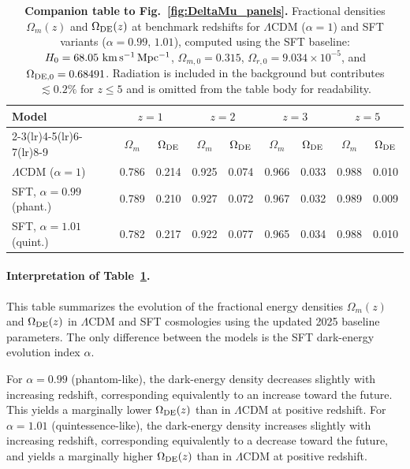 \documentclass[12pt]{article}
\begin{document}
\begin{table}[h!]
\centering
\small
\setlength{\tabcolsep}{5.5pt}
\renewcommand{\arraystretch}{1.15}
\caption{
\textbf{Companion table to Fig.~\ref{fig:DeltaMu_panels}.}
Fractional densities $\Omega_m(z)$ and $\Omega_{\rm DE}(z)$ at benchmark redshifts 
for $\Lambda$CDM ($\alpha=1$) and SFT variants ($\alpha=0.99,\,1.01$),
computed using the SFT baseline:
$H_0=68.05~{\rm km\,s^{-1}\,Mpc^{-1}}$, 
$\Omega_{m,0}=0.315$, 
$\Omega_{r,0}=9.034\times10^{-5}$, 
and $\Omega_{\rm DE,0}=0.68491$.
Radiation is included in the background but contributes $\lesssim0.2\%$ 
for $z\le5$ and is omitted from the table body for readability.
}
\label{tab:Omega_benchmarks_companion}
\begin{tabular}{lcccccccc}
\toprule
\multirow{2}{*}{Model} &
\multicolumn{2}{c}{$z=1$} &
\multicolumn{2}{c}{$z=2$} &
\multicolumn{2}{c}{$z=3$} &
\multicolumn{2}{c}{$z=5$} \\
\cmidrule(lr){2-3}\cmidrule(lr){4-5}\cmidrule(lr){6-7}\cmidrule(lr){8-9}
 & $\Omega_m$ & $\Omega_{\rm DE}$ 
 & $\Omega_m$ & $\Omega_{\rm DE}$ 
 & $\Omega_m$ & $\Omega_{\rm DE}$ 
 & $\Omega_m$ & $\Omega_{\rm DE}$ \\
\midrule
$\Lambda$CDM ($\alpha=1$)      & 0.786 & 0.214 & 0.925 & 0.074 & 0.966 & 0.033 & 0.988 & 0.010 \\
SFT, $\alpha=0.99$ (phant.)    & 0.789 & 0.210 & 0.927 & 0.072 & 0.967 & 0.032 & 0.989 & 0.009 \\
SFT, $\alpha=1.01$ (quint.)    & 0.782 & 0.217 & 0.922 & 0.077 & 0.965 & 0.034 & 0.988 & 0.010 \\
\bottomrule
\end{tabular}
\end{table}

\paragraph{Interpretation of Table~\ref{tab:Omega_benchmarks_companion}.}
This table summarizes the evolution of the fractional energy densities
$\Omega_m(z)$ and $\Omega_{\rm DE}(z)$ in $\Lambda$CDM and SFT
cosmologies using the updated 2025 baseline parameters. The only difference between the models is the SFT
dark-energy evolution index $\alpha$.

For $\alpha=0.99$ (phantom-like), the dark-energy density decreases
slightly with increasing redshift, corresponding equivalently to an
increase toward the future. This yields a marginally lower
$\Omega_{\rm DE}(z)$ than in $\Lambda$CDM at positive redshift.
For $\alpha=1.01$ (quintessence-like), the dark-energy density increases
slightly with increasing redshift, corresponding equivalently to a
decrease toward the future, and yields a marginally higher
$\Omega_{\rm DE}(z)$ than in $\Lambda$CDM at positive redshift.
\end{document}
